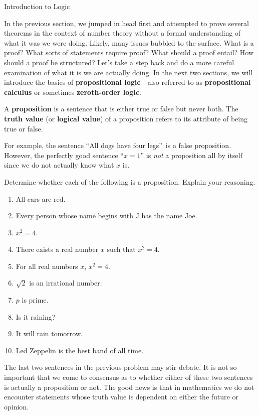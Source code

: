 \begin{section}{Introduction to Logic}\label{sec:Intro_to_Logic}

In the previous section, we jumped in head first and attempted to prove several theorems in the context of number theory without a formal understanding of what it was we were doing. Likely, many issues bubbled to the surface. What is a proof? What sorts of statements require proof? What should a proof entail?  How should a proof be structured? Let's take a step back and do a more careful examination of what it is we are actually doing. In the next two sections, we will introduce the basics of \textbf{propositional logic}---also referred to as \textbf{propositional calculus} or sometimes \textbf{zeroth-order logic}.

\begin{definition}
A \textbf{proposition} is a sentence that is either true or false but never both. The \textbf{truth value} (or \textbf{logical value}) of a proposition refers to its attribute of being true or false.
\end{definition}

For example, the sentence ``All dogs have four legs''~is a false proposition.  However, the perfectly good sentence ``$x=1$'' is \emph{not} a proposition all by itself since we do not actually know what $x$ is.

\begin{problem} Determine whether each of the following is a proposition. Explain your reasoning.
\begin{enumerate}[label=\textrm{(\alph*)}]
\item All cars are red.
\item Every person whose name begins with J has the name Joe.
\item $x^2=4$.
\item There exists a real number $x$ such that $x^2=4$.
\item For all real numbers $x$, $x^2=4$.
\item $\sqrt{2}$ is an irrational number.
\item $p$ is prime.
\item Is it raining?
\item It will rain tomorrow.
\item Led Zeppelin is the best band of all time.
\end{enumerate}
\end{problem}

The last two sentences in the previous problem may stir debate. It is not so important that we come to consensus as to whether either of these two sentences is actually a proposition or not. The good news is that in mathematics we do not encounter statements whose truth value is dependent on either the future or opinion.


\end{section}
